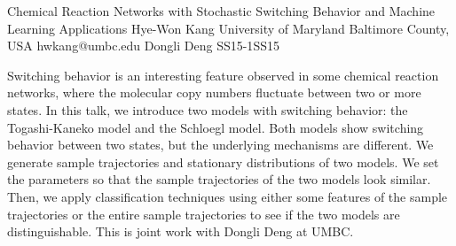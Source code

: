 \begin{talk}
  {Chemical Reaction Networks with Stochastic Switching Behavior and Machine Learning Applications}%
  {Hye-Won Kang}%
  {University of Maryland Baltimore County, USA}%
  {hwkang@umbc.edu}%
  {Dongli Deng}%
{}{}{SS15-1}{SS15}

			
Switching behavior is an interesting feature observed in some chemical reaction networks, where the molecular copy numbers fluctuate between two or more states. In this talk, we introduce two models with switching behavior: the Togashi-Kaneko model and the Schloegl model. Both models show switching behavior between two states, but the underlying mechanisms are different. We generate sample trajectories and stationary distributions of two models. We set the parameters so that the sample trajectories of the two models look similar. Then, we apply classification techniques using either some features of the sample trajectories or the entire sample trajectories to see if the two models are distinguishable. This is joint work with Dongli Deng at UMBC.



\end{talk}

